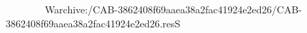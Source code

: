                                                              W   archive:/CAB-3862408f69aaea38a2fac41924e2ed26/CAB-3862408f69aaea38a2fac41924e2ed26.resS 